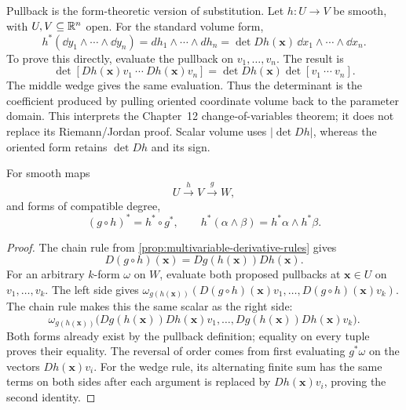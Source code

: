 \begin{remark}
Pullback is the form-theoretic version of substitution. Let $h:U\to V$
be smooth, with $U,V\subseteq\mathbb{R}^n$ open. For the standard volume form,
\[
h^*(\dd y_1\wedge\cdots\wedge\dd y_n)
=dh_1\wedge\cdots\wedge dh_n
=\det Dh(\mathbf{x})\,\dd x_1\wedge\cdots\wedge\dd x_n.
\]
To prove this directly, evaluate the pullback on $v_1,\ldots,v_n$.
The result is
\[
\det[Dh(\mathbf{x})v_1\ \cdots\ Dh(\mathbf{x})v_n]
=\det Dh(\mathbf{x})\det[v_1\ \cdots\ v_n].
\]
The middle wedge gives the
same evaluation. Thus the determinant is the coefficient produced by
pulling oriented coordinate volume back to the parameter domain.
This interprets the Chapter~12 change-of-variables theorem; it does not
replace its Riemann/Jordan proof. Scalar volume uses $|\det Dh|$,
whereas the oriented form retains $\det Dh$ and its sign.
\end{remark}

\begin{proposition}
\label{prop:pullback-rules}
For smooth maps
\[
U\xrightarrow{h}V\xrightarrow{g}W,
\]
and forms of compatible degree,
\[
(g\circ h)^*=h^*\circ g^*,
\qquad
h^*(\alpha\wedge\beta)
=h^*\alpha\wedge h^*\beta.
\]
\end{proposition}
\begin{proof}
The chain rule from \cref{prop:multivariable-derivative-rules} gives
\[
D(g\circ h)(\mathbf{x})=Dg(h(\mathbf{x}))Dh(\mathbf{x}).
\]
For an arbitrary $k$-form $\omega$ on $W$, evaluate both proposed
pullbacks at $\mathbf{x}\in U$ on $v_1,\ldots,v_k$. The left side gives
$\omega_{g(h(\mathbf{x}))}(D(g\circ h)(\mathbf{x})v_1,\ldots,D(g\circ h)(\mathbf{x})v_k)$.
The chain rule makes this the same scalar as the right side:
\[
\omega_{g(h(\mathbf{x}))}\bigl(
Dg(h(\mathbf{x}))Dh(\mathbf{x})v_1,\ldots,
Dg(h(\mathbf{x}))Dh(\mathbf{x})v_k\bigr).
\]
Both forms already exist by the pullback definition; equality on every
tuple proves their equality. The reversal of order comes from first
evaluating $g^*\omega$ on the vectors $Dh(\mathbf{x})v_i$.
For the wedge rule, its alternating finite sum has the same terms on
both sides after each argument is replaced by $Dh(\mathbf{x})v_i$, proving
the second identity.
\end{proof}

